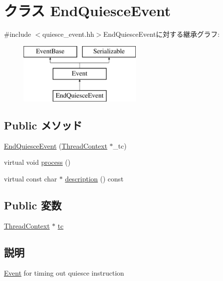 \hypertarget{classEndQuiesceEvent}{
\section{クラス EndQuiesceEvent}
\label{classEndQuiesceEvent}
}


{\ttfamily \#include $<$quiesce\_\-event.hh$>$}EndQuiesceEventに対する継承グラフ:\begin{figure}[H]
\begin{center}
\leavevmode
\includegraphics[height=3cm]{classEndQuiesceEvent}
\end{center}
\end{figure}
\subsection*{Public メソッド}
\begin{DoxyCompactItemize}
\item 
\hyperlink{classEndQuiesceEvent_adcb034f824857d692a2e756553a7c9fc}{EndQuiesceEvent} (\hyperlink{classThreadContext}{ThreadContext} $\ast$\_\-tc)
\item 
virtual void \hyperlink{classEndQuiesceEvent_a2e9c5136d19b1a95fc427e0852deab5c}{process} ()
\item 
virtual const char $\ast$ \hyperlink{classEndQuiesceEvent_a5a14fe478e2393ff51f02e9b7be27e00}{description} () const 
\end{DoxyCompactItemize}
\subsection*{Public 変数}
\begin{DoxyCompactItemize}
\item 
\hyperlink{classThreadContext}{ThreadContext} $\ast$ \hyperlink{classEndQuiesceEvent_a4455a4759e69e5ebe68ae7298cbcc37d}{tc}
\end{DoxyCompactItemize}


\subsection{説明}
\hyperlink{classEvent}{Event} for timing out quiesce instruction 

